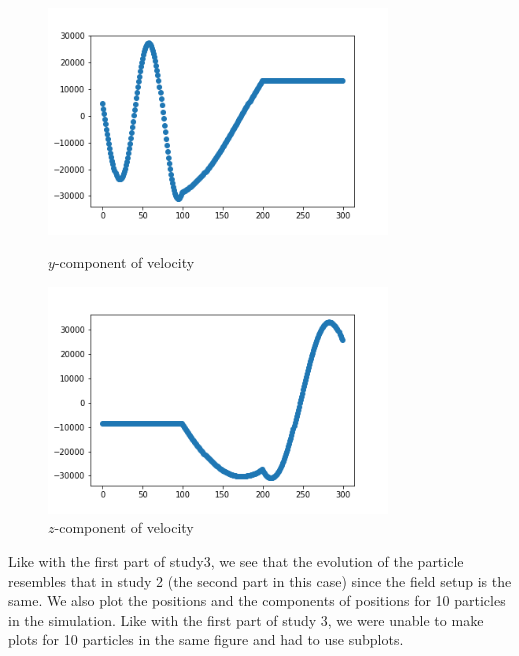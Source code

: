 \documentclass[12pt]{article}
\begin{document}
	\begin{figure}[H]
		\begin{multicols}{2}
			\includegraphics[width=\linewidth, height=6cm]{vsy3.png} \caption{$y$-component of velocity} \label{vsy3} \par
			\includegraphics[width=\linewidth, height=6cm]{vsz3.png} \caption{$z$-component of velocity} \label{vsz3} \par
		\end{multicols}
	\end{figure}
	\noindent Like with the first part of study3, we see that the evolution of the particle resembles that in study 2 (the second part in this case) since the field setup is the same. We also plot the positions and the components of positions for 10 particles in the simulation. Like with the first part of study 3, we were unable to make plots for 10 particles in the same figure and had to use subplots.
\end{document}
